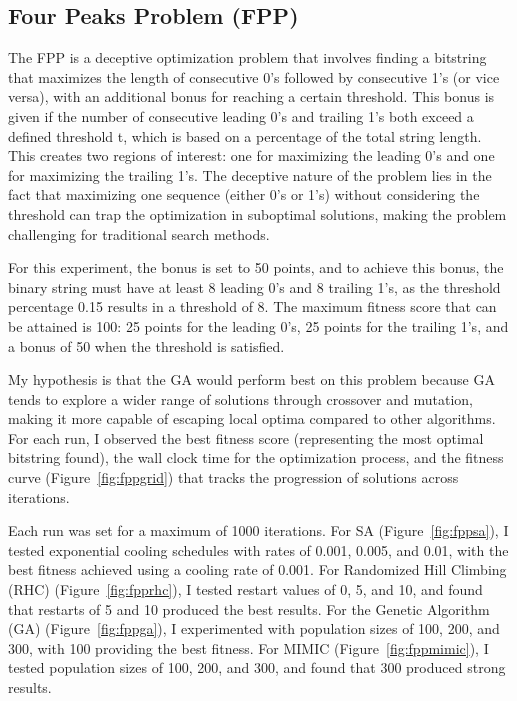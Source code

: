 \subsection{Four Peaks Problem (FPP)}
The FPP is a deceptive optimization problem that involves finding a bitstring that maximizes the length of consecutive 0's followed by consecutive 1's (or vice versa), with an additional bonus for reaching a certain threshold. This bonus is given if the number of consecutive leading 0's and trailing 1's both exceed a defined threshold t, which is based on a percentage of the total string length. This creates two regions of interest: one for maximizing the leading 0's and one for maximizing the trailing 1's. The deceptive nature of the problem lies in the fact that maximizing one sequence (either 0's or 1's) without considering the threshold can trap the optimization in suboptimal solutions, making the problem challenging for traditional search methods.

For this experiment, the bonus is set to 50 points, and to achieve this bonus, the binary string must have at least 8 leading 0's and 8 trailing 1's, as the threshold percentage 0.15 results in a threshold of 8. The maximum fitness score that can be attained is 100: 25 points for the leading 0's, 25 points for the trailing 1's, and a bonus of 50 when the threshold is satisfied.

My hypothesis is that the GA would perform best on this problem because GA tends to explore a wider range of solutions through crossover and mutation, making it more capable of escaping local optima compared to other algorithms. For each run, I observed the best fitness score (representing the most optimal bitstring found), the wall clock time for the optimization process, and the fitness curve (Figure~\ref{fig:fppgrid}) that tracks the progression of solutions across iterations.

Each run was set for a maximum of 1000 iterations. For SA (Figure~\ref{fig:fppsa}), I tested exponential cooling schedules with rates of 0.001, 0.005, and 0.01, with the best fitness achieved using a cooling rate of 0.001. For Randomized Hill Climbing (RHC) (Figure~\ref{fig:fpprhc}), I tested restart values of 0, 5, and 10, and found that restarts of 5 and 10 produced the best results. For the Genetic Algorithm (GA) (Figure~\ref{fig:fppga}), I experimented with population sizes of 100, 200, and 300, with 100 providing the best fitness. For MIMIC (Figure~\ref{fig:fppmimic}), I tested population sizes of 100, 200, and 300, and found that 300 produced strong results.

